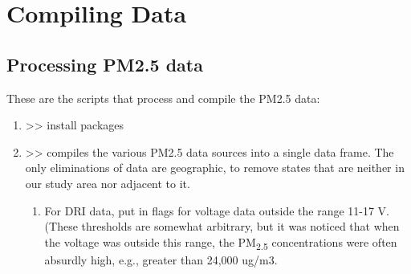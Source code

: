 \section{Compiling Data}

\subsection{Processing PM2.5 data}

These are the scripts that process and compile the PM2.5 data:
\begin{enumerate}[nolistsep]
\item {} >> install packages
\item {} >> compiles the various PM2.5 data sources into a single data frame. The only eliminations of data are geographic, to remove states that are neither in our study area nor adjacent to it.
	\begin{enumerate}
	\item For DRI data, put in flags for voltage data outside the range 11-17 V. (These thresholds are somewhat arbitrary, but it was noticed that when the voltage was outside this range, the PM\textsubscript{2.5} concentrations were often absurdly high, e.g., greater than 24,000 ug/m3.
	\end{enumerate}


\end{enumerate}
